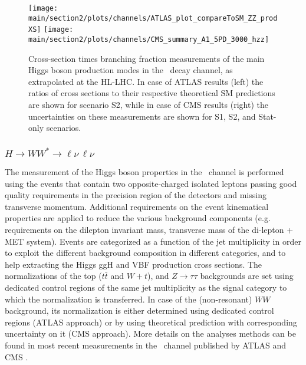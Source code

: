 \begin{figure}
  \centering
  \texttt{[image: \\main/section2/plots/channels/ATLAS\_plot\_compareToSM\_ZZ\_prodXS]}
  \texttt{[image: \\main/section2/plots/channels/CMS\_summary\_A1\_5PD\_3000\_hzz]}
  \caption{Cross-section times branching fraction measurements of the main Higgs boson production modes in the \HZZ\ decay channel, as extrapolated at the HL-LHC. In case of ATLAS results (left) the ratios of cross sections to their respective theoretical SM predictions are shown for scenario S2, while in case of CMS results (right) the uncertainties on these measurements are shown for S1, S2, and Stat-only scenarios.}
  \label{fig:HZZ_ATLAS_HLLHC_S2}
\end{figure}

\subsubsection{$H \to WW^* \to \ell\nu\,\ell\nu$}

The measurement of the Higgs boson properties in the \HWW\ channel is performed using the events that contain two opposite-charged isolated leptons passing good quality requirements in the precision region of the detectors and missing transverse momentum. Additional requirements on the event kinematical properties are applied to reduce the various background components (e.g. requirements on the dilepton invariant mass, transverse mass of the di-lepton + MET system). Events are categorized as a function of the jet multiplicity in order to exploit the different background composition in different categories, and to help extracting the Higgs ggH and VBF production cross sections. The normalizations of the top ($t\bar{t}$ and $W+t$), and $Z\rightarrow\tau\tau$ backgrounds are set using dedicated control regions of the same jet multiplicity as the signal category to which the normalization is transferred. In case of the (non-resonant) $WW$ background, its normalization is either determined using dedicated control regions (ATLAS approach) or by using theoretical prediction with corresponding uncertainty on it (CMS approach). More details on the analyses methods can be found in most recent measurements in the \HWW\ channel published by ATLAS \cite{Aaboud:2018jqu} and CMS \cite{Sirunyan:2018egh}.

